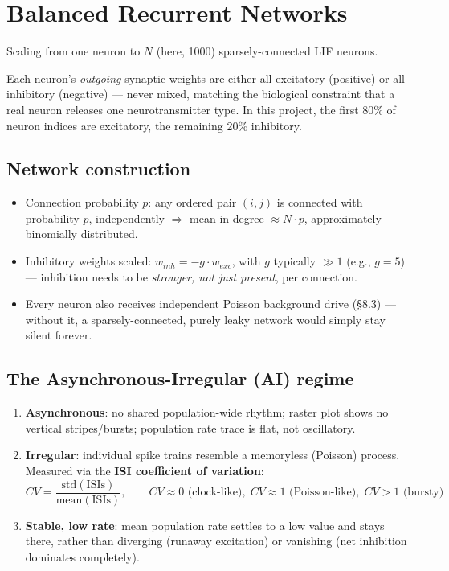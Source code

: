 \documentclass[11pt,a4paper]{article}
\begin{document}
\section{Balanced Recurrent Networks}
Scaling from one neuron to $N$ (here, 1000) sparsely-connected LIF neurons.

\begin{defbox}
Each neuron's \emph{outgoing} synaptic weights are either all excitatory (positive) or all inhibitory (negative) — never mixed, matching the biological constraint that a real neuron releases one neurotransmitter type. In this project, the first 80\% of neuron indices are excitatory, the remaining 20\% inhibitory.
\end{defbox}

\subsection{Network construction}
\begin{itemize}[itemsep=2pt]
  \item Connection probability $p$: any ordered pair $(i,j)$ is connected with probability $p$, independently $\Rightarrow$ mean in-degree $\approx N\!\cdot\!p$, approximately binomially distributed.
  \item Inhibitory weights scaled: $w_{inh} = -g \cdot w_{exc}$, with $g$ typically $\gg 1$ (e.g., $g=5$) — inhibition needs to be \emph{stronger, not just present}, per connection.
  \item Every neuron also receives independent Poisson background drive (\S8.3) — without it, a sparsely-connected, purely leaky network would simply stay silent forever.
\end{itemize}

\subsection{The Asynchronous-Irregular (AI) regime}
\begin{defbox}
\begin{enumerate}[itemsep=2pt, leftmargin=1.4em]
  \item \textbf{Asynchronous}: no shared population-wide rhythm; raster plot shows no vertical stripes/bursts; population rate trace is flat, not oscillatory.
  \item \textbf{Irregular}: individual spike trains resemble a memoryless (Poisson) process. Measured via the \textbf{ISI coefficient of variation}:
  $$CV = \frac{\text{std}(\text{ISIs})}{\text{mean}(\text{ISIs})}, \qquad CV\approx 0 \text{ (clock-like)}, \; CV\approx 1 \text{ (Poisson-like)}, \; CV>1 \text{ (bursty)}$$
  \item \textbf{Stable, low rate}: mean population rate settles to a low value and stays there, rather than diverging (runaway excitation) or vanishing (net inhibition dominates completely).
\end{enumerate}
\end{defbox}
\end{document}
